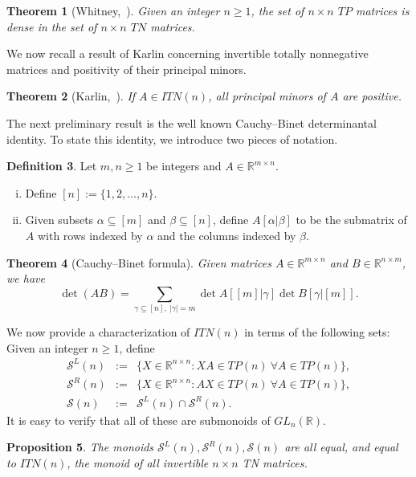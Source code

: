 \documentclass[11pt,reqno]{amsart}
\theoremstyle{plain}
\newtheorem{theorem}{Theorem}[section]
\newtheorem{prop}[theorem]{Proposition}
\theoremstyle{definition}
\newtheorem{defn}[theorem]{Definition}
\numberwithin{equation}{section}
\def\cS{\mathcal S}
\begin{document}
\begin{theorem}[Whitney,~\cite{Whitney}]\label{dwhitney}
	Given an integer $n \geq 1$, the set of $n \times n$ $TP$
	matrices is dense in the set of $n \times n$ $TN$ matrices.
\end{theorem} 

We now recall a result of Karlin concerning invertible totally nonnegative matrices and positivity of their principal minors.
\begin{theorem}[Karlin,~\cite{K68}]\label{nontn}
If $A \in ITN(n)$, all principal minors of $A$ are positive.
\end{theorem}

The next preliminary result is the well known Cauchy--Binet determinantal identity. To state this identity, we introduce two pieces of notation.
\begin{defn} Let $m,n\geq 1$ be integers and $A\in \mathbb{R}^{m\times n}$.
	\begin{enumerate}[(i)]
		\item Define $[n]:=\{1,2,\ldots,n\}$.
		\item Given subsets $\alpha \subseteq  [m]$ and $\beta \subseteq  [n]$, define $A[\alpha|\beta]$ to be the submatrix of $A$ with rows indexed by $\alpha$ and the columns indexed by $\beta$.
	\end{enumerate}
\end{defn}

\begin{theorem}[Cauchy--Binet formula]\label{C-BF}
Given matrices $A\in \mathbb{R}^{m \times n}$ and $B\in \mathbb{R}^{n \times m}$, we have
\[\det(AB)=\sum_{\gamma\subseteq [n], ~|\gamma|=m} \det A\left[[m]|\gamma\right] \det B\left[\gamma|[m]\right].\]
\end{theorem}

We now provide a characterization of $ITN(n)$ in terms of the following sets:  Given an integer $n \geq 1$, define
\begin{eqnarray}
	\cS^L(n) &:= & \{ X \in \mathbb{R}^{n \times n} : XA \in TP(n)\ \forall A \in TP(n)\},\nonumber\\
\cS^R(n) &:= & \{ X \in \mathbb{R}^{n \times n} : AX \in TP(n)\ \forall A \in TP(n)\}, \\%
\cS(n) &:= & \cS^L(n) \cap \cS^R(n).\nonumber
\end{eqnarray}
It is easy to verify that all of these are submonoids of $GL_n(\mathbb{R})$.

\begin{prop}\label{prop1}
The monoids $\cS^L(n), \cS^R(n), \cS(n)$ are all equal, and equal to $ITN(n)$, the monoid of all invertible $n \times n$ TN matrices.
\end{prop}
\end{document}
